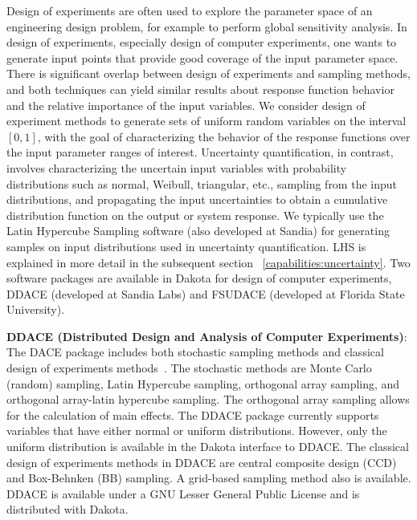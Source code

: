 Design of experiments are often used to explore the parameter space of
an engineering design problem, for example to perform global
sensitivity analysis.  In design of experiments, especially design of
computer experiments, one wants to generate input points that provide
good coverage of the input parameter space.  There is significant
overlap between design of experiments and sampling methods, and both
techniques can yield similar results about response function behavior
and the relative importance of the input variables.  We consider
design of experiment methods to generate sets of uniform random
variables on the interval $[0,1]$, with the goal of characterizing the
behavior of the response functions over the input parameter ranges of
interest. Uncertainty quantification, in contrast, involves
characterizing the uncertain input variables with probability
distributions such as normal, Weibull, triangular, etc., sampling from
the input distributions, and propagating the input uncertainties to
obtain a cumulative distribution function on the output or system
response.  We typically use the Latin Hypercube Sampling software
(also developed at Sandia) for generating samples on input
distributions used in uncertainty quantification.  LHS is explained in
more detail in the subsequent section ~\ref{capabilities:uncertainty}.
Two software packages are available in Dakota for design of computer
experiments, DDACE (developed at Sandia Labs) and FSUDACE (developed
at Florida State University).

\textbf{DDACE (Distributed Design and Analysis of Computer Experiments)}:
The DACE package includes both stochastic sampling methods and
classical design of experiments methods~\cite{TonXX}. The stochastic
methods are Monte Carlo (random) sampling, Latin Hypercube sampling,
orthogonal array sampling, and orthogonal array-latin hypercube
sampling. The orthogonal array sampling allows for the calculation
of main effects. The DDACE package currently supports variables that have
either normal or uniform distributions.  However, only the uniform
distribution is available in the Dakota interface to DDACE. The
classical design of experiments methods in DDACE are central composite
design (CCD) and Box-Behnken (BB) sampling. A grid-based sampling
method also is available. DDACE is available under a GNU Lesser
General Public License and is distributed with Dakota.

